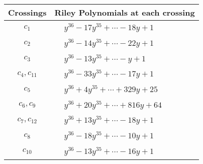 \documentclass[1p]{elsarticle_modified}
\theoremstyle{definition}
\begin{document}
\begin{tabular}{m{50pt}|m{274pt}}
Crossings & \hspace{64pt}Riley Polynomials at each crossing \\
\hline $$\begin{aligned}c_{1}\end{aligned}$$&$\begin{aligned}
&y^{36}-17 y^{35}+\cdots-18 y+1
\end{aligned}$\\
\hline $$\begin{aligned}c_{2}\end{aligned}$$&$\begin{aligned}
&y^{36}-14 y^{35}+\cdots-22 y+1
\end{aligned}$\\
\hline $$\begin{aligned}c_{3}\end{aligned}$$&$\begin{aligned}
&y^{36}-13 y^{35}+\cdots- y+1
\end{aligned}$\\
\hline $$\begin{aligned}c_{4},c_{11}\end{aligned}$$&$\begin{aligned}
&y^{36}-33 y^{35}+\cdots-17 y+1
\end{aligned}$\\
\hline $$\begin{aligned}c_{5}\end{aligned}$$&$\begin{aligned}
&y^{36}+4 y^{35}+\cdots+329 y+25
\end{aligned}$\\
\hline $$\begin{aligned}c_{6},c_{9}\end{aligned}$$&$\begin{aligned}
&y^{36}+20 y^{35}+\cdots+816 y+64
\end{aligned}$\\
\hline $$\begin{aligned}c_{7},c_{12}\end{aligned}$$&$\begin{aligned}
&y^{36}+13 y^{35}+\cdots-18 y+1
\end{aligned}$\\
\hline $$\begin{aligned}c_{8}\end{aligned}$$&$\begin{aligned}
&y^{36}-18 y^{35}+\cdots-10 y+1
\end{aligned}$\\
\hline $$\begin{aligned}c_{10}\end{aligned}$$&$\begin{aligned}
&y^{36}-13 y^{35}+\cdots-16 y+1
\end{aligned}$\\
\hline
\end{tabular}\\~\\
\end{document}
